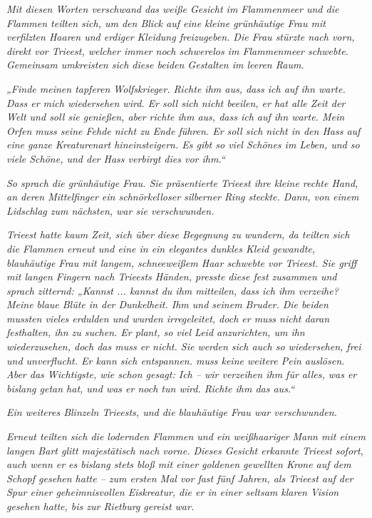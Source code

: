 \textit{Mit diesen Worten verschwand das weiße Gesicht im Flammenmeer und die Flammen teilten sich, um den Blick auf eine kleine grünhäutige Frau mit verfilzten Haaren und erdiger Kleidung freizugeben. Die Frau stürzte nach vorn, direkt vor Trieest, welcher immer noch schwerelos im Flammenmeer schwebte. Gemeinsam umkreisten sich diese beiden Gestalten im leeren Raum.}

\textit{„Finde meinen tapferen Wolfskrieger. Richte ihm aus, dass ich auf ihn warte. Dass er mich wiedersehen wird. Er soll sich nicht beeilen, er hat alle Zeit der Welt und soll sie genießen, aber richte ihm aus, dass ich auf ihn warte. Mein Orfen muss seine Fehde nicht zu Ende führen. Er soll sich nicht in den Hass auf eine ganze Kreaturenart hineinsteigern. Es gibt so viel Schönes im Leben, und so viele Schöne, und der Hass verbirgt dies vor ihm.“}

\textit{So sprach die grünhäutige Frau. Sie präsentierte Trieest ihre kleine rechte Hand, an deren Mittelfinger ein schnörkelloser silberner Ring steckte. Dann, von einem Lidschlag zum nächsten, war sie verschwunden.}\bigskip



\textit{Trieest hatte kaum Zeit, sich über diese Begegnung zu wundern, da teilten sich die Flammen erneut und eine in ein elegantes dunkles Kleid gewandte, blauhäutige Frau mit langem, schneeweißem Haar schwebte vor Trieest. Sie griff mit langen Fingern nach Trieests Händen, presste diese fest zusammen und sprach zitternd: „Kannst ... kannst du ihm mitteilen, dass ich ihm verzeihe? Meine blaue Blüte in der Dunkelheit. Ihm und seinem Bruder. Die beiden mussten vieles erdulden und wurden irregeleitet, doch er muss nicht daran festhalten, ihn zu suchen. Er plant, so viel Leid anzurichten, um ihn wiederzusehen, doch das muss er nicht. Sie werden sich auch so wiedersehen, frei und unverflucht. Er kann sich entspannen. muss keine weitere Pein auslösen. Aber das Wichtigste, wie schon gesagt: Ich – wir verzeihen ihm für alles, was er bislang getan hat, und was er noch tun wird. Richte ihm das aus.“}

\textit{Ein weiteres Blinzeln Trieests, und die blauhäutige Frau war verschwunden.}\bigskip



\textit{Erneut teilten sich die lodernden Flammen und ein weißhaariger Mann mit einem langen Bart glitt majestätisch nach vorne. Dieses Gesicht erkannte Trieest sofort, auch wenn er es bislang stets bloß mit einer goldenen gewellten Krone auf dem Schopf gesehen hatte – zum ersten Mal vor fast fünf Jahren, als Trieest auf der Spur einer geheimnisvollen Eiskreatur, die er in einer seltsam klaren Vision gesehen hatte, bis zur Rietburg gereist war.}

